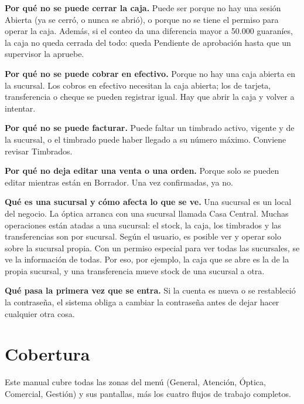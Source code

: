 \textbf{Por qué no se puede cerrar la caja.} Puede ser porque no hay una sesión Abierta (ya se cerró, o nunca se abrió), o porque no se tiene el permiso para operar la caja. Además, si el conteo da una diferencia mayor a 50.000 guaraníes, la caja no queda cerrada del todo: queda Pendiente de aprobación hasta que un supervisor la apruebe.

\textbf{Por qué no se puede cobrar en efectivo.} Porque no hay una caja abierta en la sucursal. Los cobros en efectivo necesitan la caja abierta; los de tarjeta, transferencia o cheque se pueden registrar igual. Hay que abrir la caja y volver a intentar.

\textbf{Por qué no se puede facturar.} Puede faltar un timbrado activo, vigente y de la sucursal, o el timbrado puede haber llegado a su número máximo. Conviene revisar Timbrados.

\textbf{Por qué no deja editar una venta o una orden.} Porque solo se pueden editar mientras están en Borrador. Una vez confirmadas, ya no.

\textbf{Qué es una sucursal y cómo afecta lo que se ve.} Una sucursal es un local del negocio. La óptica arranca con una sucursal llamada Casa Central. Muchas operaciones están atadas a una sucursal: el stock, la caja, los timbrados y las transferencias son por sucursal. Según el usuario, es posible ver y operar solo sobre la sucursal propia. Con un permiso especial para ver todas las sucursales, se ve la información de todas. Por eso, por ejemplo, la caja que se abre es la de la propia sucursal, y una transferencia mueve stock de una sucursal a otra.

\textbf{Qué pasa la primera vez que se entra.} Si la cuenta es nueva o se restableció la contraseña, el sistema obliga a cambiar la contraseña antes de dejar hacer cualquier otra cosa.

\section{Cobertura}
\label{sec:mu-cobertura}

Este manual cubre todas las zonas del menú (General, Atención, Óptica, Comercial, Gestión) y sus pantallas, más los cuatro flujos de trabajo completos.


